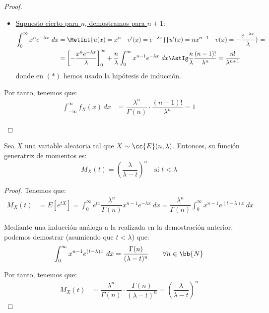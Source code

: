 \begin{proof}
\begin{itemize}
\begin{itemize}
            \item \ul{Supuesto cierto para $n$, demostramos para $n+1$}:
            \begin{align*}
                \int_{0}^{\infty} x^{n}e^{-\lambda x}~dx &=
                \MetInt{u(x) = x^n \quad v'(x) = e^{-\lambda x}}{u'(x) = nx^{n-1} \quad v(x) = -\dfrac{e^{-\lambda x}}{\lambda}}
                =\\&= \left[ -\dfrac{x^n e^{-\lambda x}}{\lambda} \right]_{0}^{\infty} + \dfrac{n}{\lambda} \int_{0}^{\infty} x^{n-1}e^{-\lambda x}~dx
                \AstIg \dfrac{n}{\lambda} \dfrac{(n-1)!}{\lambda^n} = \dfrac{n!}{\lambda^{n+1}}
            \end{align*}
            donde en $(\ast)$ hemos usado la hipótesis de inducción.
        \end{itemize}
        Por tanto, tenemos que:
        \begin{align*}
            \int_{-\infty}^{\infty} f_X(x) \, dx &=
            \dfrac{\lambda^n}{\Gamma(n)} \cdot \dfrac{(n-1)!}{\lambda^n} = 1
        \end{align*}
    \end{itemize}
\end{proof}

\begin{prop}
    Sea $X$ una variable aleatoria tal que $X\sim \cc{E}(n,\lambda)$. Entonces, su función generatriz de momentos es:
    \begin{equation*}
        M_X(t) = \left( \dfrac{\lambda}{\lambda-t} \right)^n \quad \text{si } t<\lambda
    \end{equation*}
\end{prop}
\begin{proof}
    Tenemos que:
    \begin{align*}
        M_X(t) &= E\left[e^{tX}\right] = \int_{0}^{\infty} e^{tx} \dfrac{\lambda^n}{\Gamma(n)}x^{n-1}e^{-\lambda x}~dx
        = \dfrac{\lambda^n}{\Gamma(n)} \int_{0}^{\infty} x^{n-1}e^{(t-\lambda)x}~dx
    \end{align*}
    
    Mediante una inducción análoga a la realizada en la demostración anterior, podemos demostrar (asumiendo que $t<\lambda$) que:
    \begin{equation*}
        \int_{0}^{\infty} x^{n-1}e^{(t-\lambda)x}~dx = \dfrac{\Gamma(n)}{(\lambda-t)^n} \qquad \forall n\in \bb{N}
    \end{equation*}

    Por tanto, tenemos que:
    \begin{align*}
        M_X(t) &= \dfrac{\lambda^n}{\Gamma(n)} \cdot \dfrac{\Gamma(n)}{(\lambda-t)^n} = \left( \dfrac{\lambda}{\lambda-t} \right)^n
    \end{align*}
\end{proof}


